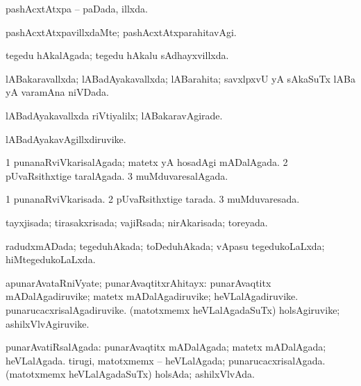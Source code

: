 {{\bentry
{} 
\gl{\gu}
\expl{}
\bmng
pashAcxtAtxpa -- paDada, illxda. 
\emng
\eentry

\bentry
{} 
\gl{\kirxvi}
\expl{}
\bmng
pashAcxtAtxpavillxdaMte; pashAcxtAtxparahitavAgi. 
\emng
\eentry

\bentry
{} 
\gl{\gu}
\expl{}
\bmng
tegedu hAkalAgada; tegedu hAkalu sAdhayxvillxda. 
\emng
\eentry

\bentry
{} 
\gl{\gu}
\expl{}
\bmng
lABakaravallxda; lABadAyakavallxda; lABarahita; savxlpxvU yA sAkaSuTx lABa yA varamAna niVDada. 
\emng
\eentry

\bentry
{} 
\gl{\kirxvi}
\expl{}
\bmng
lABadAyakavallxda riVtiyalilx; lABakaravAgirade. 
\emng
\eentry

\bentry
{} 
\gl{\nA}
\expl{}
\bmng
lABadAyakavAgillxdiruvike. 
\emng
\eentry

\bentry
{} 
\gl{\gu}
\expl{}
\bmng
\bnum
\num{1} punanaRviVkarisalAgada; matetx yA hosadAgi mADalAgada. 
\num{2} pUvaRsithxtige taralAgada. 
\num{3} muMduvaresalAgada. 
\enum
\emng
\eentry

\bentry
{} 
\gl{\gu}
\expl{}
\bmng
\bnum
\num{1} punanaRviVkarisada. 
\num{2} pUvaRsithxtige tarada. 
\num{3} muMduvaresada. 
\enum
\emng
\eentry

\bentry
{} 
\gl{\gu}
\expl{}
\bmng
tayxjisada; tirasakxrisada; vajiRsada; nirAkarisada; toreyada. 
\emng
\eentry

\bentry
{} 
\gl{\gu}
\expl{}
\bmng
radudxmADada; tegeduhAkada; toDeduhAkada; vApasu tegedukoLaLxda; hiMtegedukoLaLxda. 
\emng
\eentry

\bentry
{} 
\gl{\nA}
\expl{}
\bmng
apunarAvataRniVyate; punarAvaqtitxrAhitayx: 
\banum
{} punarAvaqtitx mADalAgadiruvike; matetx mADalAgadiruvike; heVLalAgadiruvike. 
 punarucacxrisalAgadiruvike. 
 (matotxmemx heVLalAgadaSuTx) holsAgiruvike; ashilxVlvAgiruvike. 
\eanum
\emng
\eentry

\bentry
{} 
\gl{\gu}
\expl{}
\bmng
punarAvatiRsalAgada: 
\banum
{} punarAvaqtitx mADalAgada; matetx mADalAgada; heVLalAgada. 
 tirugi, matotxmemx -- heVLalAgada; punarucacxrisalAgada. 
 (matotxmemx heVLalAgadaSuTx) holsAda; ashilxVlvAda. 
\eanum
\emng
\eentry

}}
